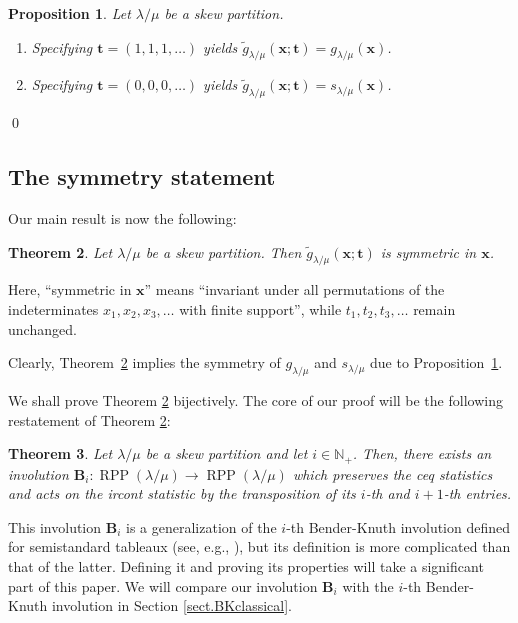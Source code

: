 \documentclass[12pt]{article}
\theoremstyle{plain}
\newtheorem{theorem}{Theorem}
\newtheorem{proposition}[theorem]{Proposition}
\theoremstyle{definition}
\def\t{{\mathbf{t}}}
\def\x{{\mathbf{x}}}
\def\lm{{\lambda/\mu}}
\begin{document}
\begin{proposition}
\label{prop.gtilde.gener}Let $\lambda/\mu$ be a skew partition.

\begin{enumerate}
\item[\textbf{(a)}] Specifying $\t=\left(
1,1,1,\ldots\right)  $ yields $\widetilde{g}_{\lambda/\mu}(\x;\t)=g_{\lambda/\mu}(\x)$.

\item[\textbf{(b)}] Specifying $\t =\left(
0,0,0,\ldots\right)  $ yields $\widetilde{g}_{\lambda/\mu}(\x;\t)=s_{\lambda/\mu}(\x)$.

\end{enumerate}
\end{proposition} \qed


\subsection{The symmetry statement}

Our main result is now the following:

\begin{theorem}
\label{thm.gtilde.symm}Let $\lambda/\mu$ be a skew partition. Then
$\widetilde{g}_{\lambda/\mu}(\x;\t)$ is symmetric in $\x$.
\end{theorem}

Here, ``symmetric in $\x$'' means ``invariant under all permutations of the indeterminates $x_1, x_2, x_3, \ldots$ with finite support'', while $t_1, t_2, t_3, \ldots$ remain unchanged.

Clearly, Theorem~\ref{thm.gtilde.symm} implies the symmetry of
$g_\lm$ and $s_\lm$ due to Proposition~\ref{prop.gtilde.gener}.


We shall prove Theorem \ref{thm.gtilde.symm} bijectively. The core of our
proof will be the following restatement of Theorem \ref{thm.gtilde.symm}:


 
\begin{theorem}
\label{thm.BK}Let $\lambda/\mu$ be a skew partition and let $i\in\mathbb{N}_{+}$. Then, there exists an
involution $\mathbf{B}_{i}:\operatorname{RPP}\left(  \lambda/\mu\right)
\rightarrow\operatorname{RPP}\left(  \lambda/\mu\right)  $ which preserves the ceq statistics and acts on the ircont statistic by the transposition of its $i$-th and $i+1$-th entries.
\end{theorem}


This involution $\mathbf{B}_{i}$ is a generalization of the $i$-th
Bender-Knuth involution defined for semistandard tableaux (see, e.g.,
\cite[proof of Proposition 2.11]{GriRei15}), but its definition is more
complicated than that of the latter. Defining it and proving its
properties will take a significant part of this paper.
We will compare our involution
$\mathbf{B}_{i}$ with the $i$-th Bender-Knuth involution in Section
\ref{sect.BKclassical}.
\end{document}
